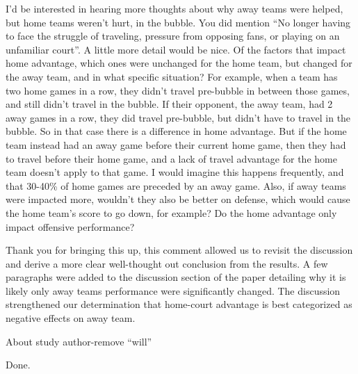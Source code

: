 \documentclass[12pt]{article}
\newenvironment{comment}%
{\begin{quoting}\noindent\small\it\ignorespaces%
  }{\end{quoting}}
\begin{document}
\begin{comment}
I’d be interested in hearing more thoughts about why away teams were helped, but home teams weren’t
hurt, in the bubble. You did mention “No longer having to face the struggle of traveling, pressure from
opposing fans, or playing on an unfamiliar court”. A little more detail would be nice. Of the factors that
impact home advantage, which ones were unchanged for the home team, but changed for the away team,
and in what specific situation?
For example, when a team has two home games in a row, they didn’t travel pre-bubble in between those
games, and still didn’t travel in the bubble. If their opponent, the away team, had 2 away games in a row,
they did travel pre-bubble, but didn’t have to travel in the bubble. So in that case there is a difference in
home advantage.
But if the home team instead had an away game before their current home game, then they had to travel
before their home game, and a lack of travel advantage for the home team doesn’t apply to that game. I
would imagine this happens frequently, and that 30-40\% of home games are preceded by an away game.
Also, if away teams were impacted more, wouldn’t they also be better on defense, which would cause the
home team’s score to go down, for example? Do the home advantage only impact offensive performance?
\end{comment}

 Thank you for bringing this up, this comment allowed us to revisit the discussion and derive a more clear well-thought out conclusion from the results. A few paragraphs were added to the discussion section of the paper detailing why it is likely only away teams performance were significantly changed. The discussion strengthened our determination that home-court advantage is best categorized as negative effects on away team.

\begin{comment}
About study author-remove “will”
\end{comment}

Done.




\end{document}
